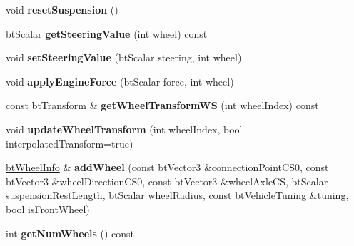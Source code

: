 \begin{DoxyCompactItemize}
\item 
\hypertarget{classbt_raycast_vehicle_a327f031abd00d7bee5546b7602d7fd6b}{void {\bfseries reset\+Suspension} ()}\label{classbt_raycast_vehicle_a327f031abd00d7bee5546b7602d7fd6b}

\item 
\hypertarget{classbt_raycast_vehicle_a133842b10f07bb66ce829d2f1eb869ba}{bt\+Scalar {\bfseries get\+Steering\+Value} (int wheel) const }\label{classbt_raycast_vehicle_a133842b10f07bb66ce829d2f1eb869ba}

\item 
\hypertarget{classbt_raycast_vehicle_afbbaf96eadb808cea4102b696abd4649}{void {\bfseries set\+Steering\+Value} (bt\+Scalar steering, int wheel)}\label{classbt_raycast_vehicle_afbbaf96eadb808cea4102b696abd4649}

\item 
\hypertarget{classbt_raycast_vehicle_aafe6f81794ec7ad1ce900bdca2facb92}{void {\bfseries apply\+Engine\+Force} (bt\+Scalar force, int wheel)}\label{classbt_raycast_vehicle_aafe6f81794ec7ad1ce900bdca2facb92}

\item 
\hypertarget{classbt_raycast_vehicle_a8ea74d71c3985d17822ec8fbb0b6d40d}{const bt\+Transform \& {\bfseries get\+Wheel\+Transform\+W\+S} (int wheel\+Index) const }\label{classbt_raycast_vehicle_a8ea74d71c3985d17822ec8fbb0b6d40d}

\item 
\hypertarget{classbt_raycast_vehicle_adf67ae421334225c886c3dc4c12fe1f2}{void {\bfseries update\+Wheel\+Transform} (int wheel\+Index, bool interpolated\+Transform=true)}\label{classbt_raycast_vehicle_adf67ae421334225c886c3dc4c12fe1f2}

\item 
\hypertarget{classbt_raycast_vehicle_ab553ee172346b9cea796abd56ba12a40}{\hyperlink{structbt_wheel_info}{bt\+Wheel\+Info} \& {\bfseries add\+Wheel} (const bt\+Vector3 \&connection\+Point\+C\+S0, const bt\+Vector3 \&wheel\+Direction\+C\+S0, const bt\+Vector3 \&wheel\+Axle\+C\+S, bt\+Scalar suspension\+Rest\+Length, bt\+Scalar wheel\+Radius, const \hyperlink{classbt_raycast_vehicle_1_1bt_vehicle_tuning}{bt\+Vehicle\+Tuning} \&tuning, bool is\+Front\+Wheel)}\label{classbt_raycast_vehicle_ab553ee172346b9cea796abd56ba12a40}

\item 
\hypertarget{classbt_raycast_vehicle_aed62b89ec3a5e5fb97894d1ad6cbf3a0}{int {\bfseries get\+Num\+Wheels} () const }\label{classbt_raycast_vehicle_aed62b89ec3a5e5fb97894d1ad6cbf3a0}


\end{DoxyCompactItemize}
